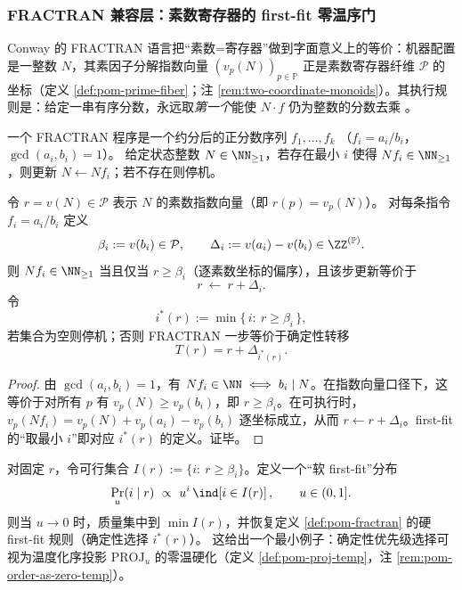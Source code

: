 \subsubsection{FRACTRAN 兼容层：素数寄存器的 first-fit 零温序门}\label{subsec:pom-fractran}
Conway 的 FRACTRAN 语言把“素数=寄存器”做到字面意义上的等价：机器配置是一整数 \(N\)，其素因子分解指数向量 \((v_p(N))_{p\in\mathbb{P}}\) 正是素数寄存器纤维 \(\mathcal{P}\) 的坐标（定义 \ref{def:pom-prime-fiber}；注 \ref{rem:two-coordinate-monoids}）。其执行规则是：给定一串有序分数，永远取\emph{第一个}能使 \(N\cdot f\) 仍为整数的分数去乘 \cite{Conway1987FRACTRAN}。

\begin{definition}\label{def:pom-fractran}
一个 FRACTRAN 程序是一个约分后的正分数序列
\(
f_1,\dots,f_k
 \)
（\(f_i=a_i/b_i\)，\(\gcd(a_i,b_i)=1\)）。
给定状态整数 \(N\in\NN_{\ge 1}\)，若存在最小 \(i\) 使得 \(Nf_i\in\NN_{\ge 1}\)，则更新 \(N\leftarrow Nf_i\)；若不存在则停机。
\end{definition}

\begin{proposition}[FRACTRAN = \texorpdfstring{$\mathcal{P}$}{P} 上的受序门控平移]\label{prop:pom-fractran-prime-translation}
令 \(r=v(N)\in\mathcal{P}\) 表示 \(N\) 的素数指数向量（即 \(r(p)=v_p(N)\)）。
对每条指令 \(f_i=a_i/b_i\) 定义
\[
\beta_i:=v(b_i)\in\mathcal{P},\qquad
\Delta_i:=v(a_i)-v(b_i)\in \ZZ^{(\mathbb{P})}.
\]
则 \(Nf_i\in\NN_{\ge 1}\) 当且仅当 \(r\ge \beta_i\)（逐素数坐标的偏序），且该步更新等价于
\[
r\ \longleftarrow\ r+\Delta_i.
\]
令
\[
i^\ast(r):=\min\{\,i:\ r\ge \beta_i\,\},
\]
若集合为空则停机；否则 FRACTRAN 一步等价于确定性转移
\[
T(r)=r+\Delta_{i^\ast(r)}.
\]
\end{proposition}
\begin{proof}
由 \(\gcd(a_i,b_i)=1\)，有 \(Nf_i\in\NN\iff b_i\mid N\)。在指数向量口径下，这等价于对所有 \(p\) 有 \(v_p(N)\ge v_p(b_i)\)，即 \(r\ge \beta_i\)。在可执行时，
\(
v_p(Nf_i)=v_p(N)+v_p(a_i)-v_p(b_i)
\)
逐坐标成立，从而 \(r\leftarrow r+\Delta_i\)。first-fit 的“取最小 \(i\)”即对应 \(i^\ast(r)\) 的定义。证毕。
\end{proof}

\begin{remark}\label{rem:pom-fractran-zero-temp}
对固定 \(r\)，令可行集合 \(I(r):=\{i:\ r\ge \beta_i\}\)。定义一个“软 first-fit”分布
\[
\Pr_u(i\mid r)\ \propto\ u^{i}\,\ind\!\left[i\in I(r)\right],\qquad u\in(0,1].
\]
则当 \(u\to 0\) 时，质量集中到 \(\min I(r)\)，并恢复定义 \ref{def:pom-fractran} 的硬 first-fit 规则（确定性选择 \(i^\ast(r)\)）。
这给出一个最小例子：确定性优先级选择可视为温度化序投影 \(\mathrm{PROJ}_u\) 的零温硬化（定义 \ref{def:pom-proj-temp}，注 \ref{rem:pom-order-as-zero-temp}）。
\end{remark}

